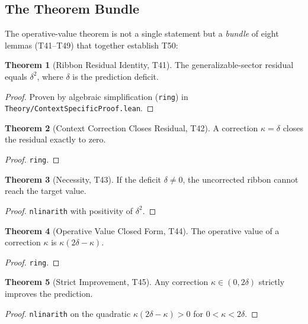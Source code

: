 \documentclass[11pt,a4paper]{article}
\theoremstyle{definition}
\newtheorem{theorem}{Theorem}[section]
\theoremstyle{plain}
\begin{document}
\subsection{The Theorem Bundle}
\label{subsec:bundle}

The operative-value theorem is not a single statement but a \emph{bundle} of eight lemmas (T41--T49) that together establish T50:

\begin{theorem}[Ribbon Residual Identity, T41]
\label{thm:residual}
The generalizable-sector residual equals $\delta^2$, where $\delta$ is the prediction deficit.
\end{theorem}
\begin{proof}
Proven by algebraic simplification (\texttt{ring}) in \texttt{Theory/ContextSpecificProof.lean}.
\end{proof}

\begin{theorem}[Context Correction Closes Residual, T42]
\label{thm:closes}
A correction $\kappa = \delta$ closes the residual exactly to zero.
\end{theorem}
\begin{proof}
\texttt{ring}.
\end{proof}

\begin{theorem}[Necessity, T43]
\label{thm:necessary}
If the deficit $\delta \neq 0$, the uncorrected ribbon cannot reach the target value.
\end{theorem}
\begin{proof}
\texttt{nlinarith} with positivity of $\delta^2$.
\end{proof}

\begin{theorem}[Operative Value Closed Form, T44]
\label{thm:closedform}
The operative value of a correction $\kappa$ is $\kappa(2\delta - \kappa)$.
\end{theorem}
\begin{proof}
\texttt{ring}.
\end{proof}

\begin{theorem}[Strict Improvement, T45]
\label{thm:strict}
Any correction $\kappa \in (0, 2\delta)$ strictly improves the prediction.
\end{theorem}
\begin{proof}
\texttt{nlinarith} on the quadratic $\kappa(2\delta - \kappa) > 0$ for $0 < \kappa < 2\delta$.
\end{proof}
\end{document}

